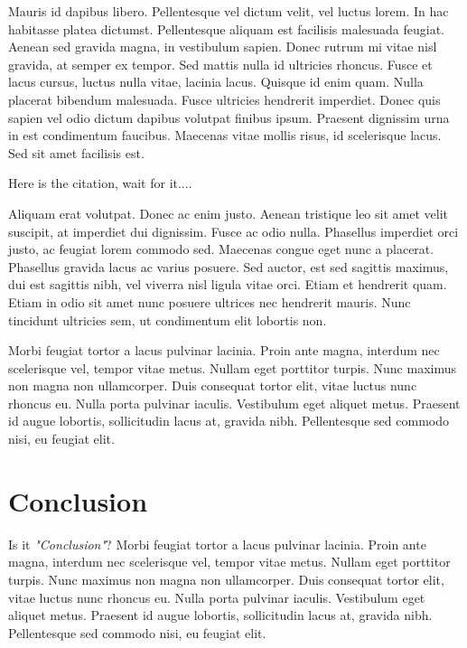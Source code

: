 \documentclass[10pt,twoside,twocolumn,notitle,a4paper]{IEEEtran}
\newenvironment{notation}{%
   \def\FrameCommand{\colorbox{yellow!20}}%
   \MakeFramed{\advance\hsize-\width \FrameRestore}}
 {\endMakeFramed}
\begin{document}
Mauris id dapibus libero. Pellentesque vel dictum velit, vel luctus lorem. In hac habitasse platea dictumst. Pellentesque aliquam est facilisis malesuada feugiat. Aenean sed gravida magna, in vestibulum sapien. Donec rutrum mi vitae nisl gravida, at semper ex tempor. Sed mattis nulla id ultricies rhoncus. Fusce et lacus cursus, luctus nulla vitae, lacinia lacus. Quisque id enim quam. Nulla placerat bibendum malesuada. Fusce ultricies hendrerit imperdiet. Donec quis sapien vel odio dictum dapibus volutpat finibus ipsum. Praesent dignissim urna in est condimentum faucibus. Maecenas vitae mollis risus, id scelerisque lacus. Sed sit amet facilisis est.

\begin{notation}
Here is the citation, wait for it....
\end{notation}

Aliquam erat volutpat. Donec ac enim justo. Aenean tristique \citep{knuthwebsite} leo sit amet velit suscipit, at imperdiet dui dignissim. Fusce ac odio nulla. Phasellus imperdiet orci justo, ac feugiat lorem commodo sed. Maecenas congue eget nunc a placerat. Phasellus gravida lacus ac varius posuere. Sed auctor, est sed sagittis maximus, dui est sagittis nibh, vel viverra nisl ligula vitae orci. Etiam et hendrerit quam. Etiam in odio sit amet nunc posuere ultrices nec hendrerit mauris. Nunc tincidunt ultricies sem, ut condimentum elit lobortis non.

Morbi feugiat tortor a lacus pulvinar lacinia. Proin ante magna, interdum nec scelerisque vel, tempor vitae metus. Nullam eget porttitor turpis. Nunc maximus non magna non ullamcorper. Duis consequat tortor elit, vitae luctus nunc rhoncus eu. Nulla porta pulvinar iaculis. Vestibulum eget aliquet metus. Praesent id augue lobortis, sollicitudin lacus at, gravida nibh. Pellentesque sed commodo nisi, eu feugiat elit.


\section{Conclusion}

\begin{notation}
Is it \textit{"Conclusion"}?
\end{notation}
Morbi feugiat tortor a lacus pulvinar lacinia. Proin ante magna, interdum nec scelerisque vel, tempor vitae metus. Nullam eget porttitor turpis. Nunc maximus non magna non ullamcorper. Duis \citep{einstein} consequat tortor elit, vitae luctus nunc rhoncus eu. Nulla porta pulvinar iaculis. Vestibulum eget aliquet metus. Praesent id augue lobortis, sollicitudin lacus at, gravida nibh. Pellentesque sed commodo nisi, eu feugiat elit.




\end{document}
